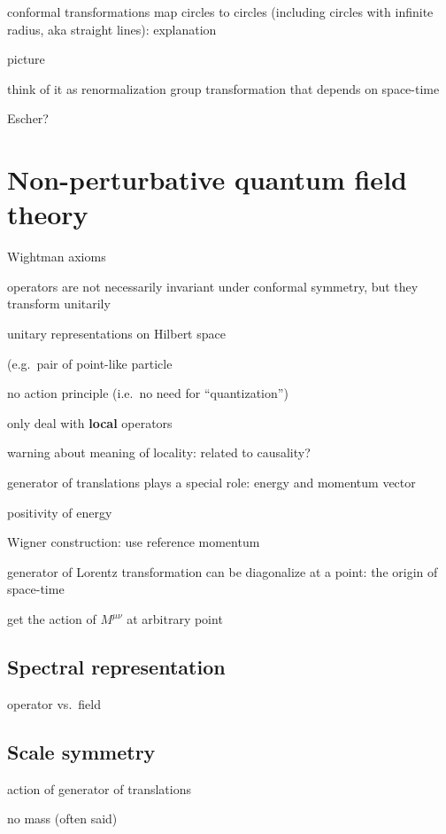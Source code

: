\documentclass[a4paper,12pt]{article}
\numberwithin{equation}{section}
\begin{document}
conformal transformations map circles to circles (including circles with infinite radius, aka straight lines): explanation

picture

think of it as renormalization group transformation that depends on space-time

Escher?





\section{Non-perturbative quantum field theory}

Wightman axioms

operators are not necessarily invariant under conformal symmetry, but they transform unitarily

unitary representations on Hilbert space

(e.g.~pair of point-like particle

no action principle
(i.e.~no need for ``quantization'')


only deal with \textbf{local} operators

warning about meaning of locality: related to causality?



generator of translations plays a special role: energy and momentum vector

positivity of energy 



Wigner construction: use reference momentum


generator of Lorentz transformation can be diagonalize at a point: the origin of space-time

get the action of $M^{\mu\nu}$ at arbitrary point


\subsection{Spectral representation}

operator vs.~field

\subsection{Scale symmetry}

action of generator of translations

no mass (often said)
\end{document}
